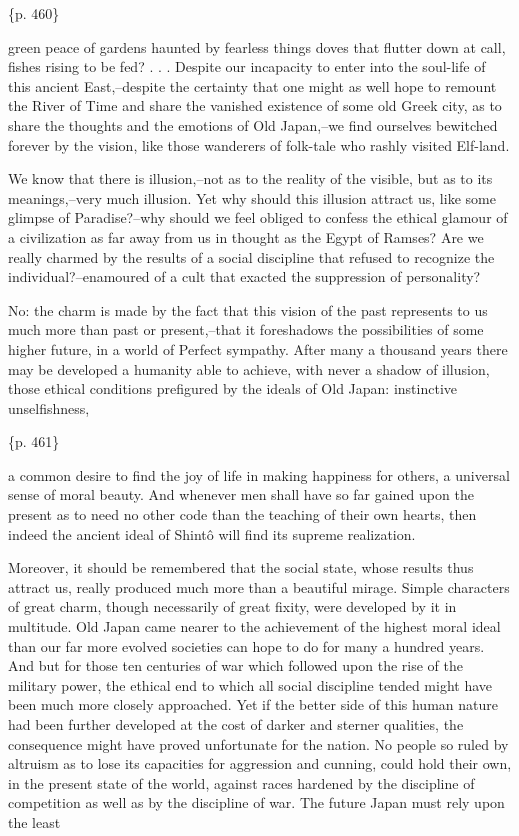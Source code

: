 \{p. 460\}

green peace of gardens haunted by fearless things doves that flutter down at call, fishes rising to be fed? . . . Despite our incapacity to enter into the soul-life of this ancient East,--despite the certainty that one might as well hope to remount the River of Time and share the vanished existence of some old Greek city, as to share the thoughts and the emotions of Old Japan,--we find ourselves bewitched forever by the vision, like those wanderers of folk-tale who rashly visited Elf-land.

We know that there is illusion,--not as to the reality of the visible, but as to its meanings,--very much illusion. Yet why should this illusion attract us, like some glimpse of Paradise?--why should we feel obliged to confess the ethical glamour of a civilization as far away from us in thought as the Egypt of Ramses? Are we really charmed by the results of a social discipline that refused to recognize the individual?--enamoured of a cult that exacted the suppression of personality?

No: the charm is made by the fact that this vision of the past represents to us much more than past or present,--that it foreshadows the possibilities of some higher future, in a world of Perfect sympathy. After many a thousand years there may be developed a humanity able to achieve, with never a shadow of illusion, those ethical conditions prefigured by the ideals of Old Japan: instinctive unselfishness,

\{p. 461\}

a common desire to find the joy of life in making happiness for others, a universal sense of moral beauty. And whenever men shall have so far gained upon the present as to need no other code than the teaching of their own hearts, then indeed the ancient ideal of Shintô will find its supreme realization.



Moreover, it should be remembered that the social state, whose results thus attract us, really produced much more than a beautiful mirage. Simple characters of great charm, though necessarily of great fixity, were developed by it in multitude. Old Japan came nearer to the achievement of the highest moral ideal than our far more evolved societies can hope to do for many a hundred years. And but for those ten centuries of war which followed upon the rise of the military power, the ethical end to which all social discipline tended might have been much more closely approached. Yet if the better side of this human nature had been further developed at the cost of darker and sterner qualities, the consequence might have proved unfortunate for the nation. No people so ruled by altruism as to lose its capacities for aggression and cunning, could hold their own, in the present state of the world, against races hardened by the discipline of competition as well as by the discipline of war. The future Japan must rely upon the least

